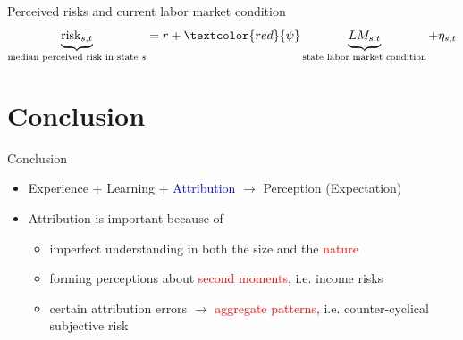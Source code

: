 \documentclass{beamer}
\begin{document}
	\begin{frame}{Perceived risks and current labor market condition}
	\begin{eqnarray*}
		\underbrace{\overline{\text{risk}_{s,t}} }_{\text{median perceived risk in state $s$}}= r + \textcolor{red}{\psi} \underbrace{LM_{s,t}}_{\text{state labor market condition}}  + \eta_{s,t}
	\end{eqnarray*}
		\begin{table}
			\centering
			\label{macro_corr_he}
		\end{table}
	\end{frame}
	


\section{Conclusion}

\begin{frame}{Conclusion}
	\begin{itemize}
		\item Experience + Learning + \textcolor{blue}{Attribution} $\rightarrow$ Perception (Expectation) 
		\item Attribution is important because of
		\begin{itemize}
			\item imperfect understanding in both the size and the \textcolor{red}{nature} 
			\item forming perceptions about \textcolor{red}{second moments}, i.e. income risks
			\item certain attribution errors $\rightarrow$ \textcolor{red}{aggregate patterns}, i.e. counter-cyclical subjective risk 
		\end{itemize} 
	\end{itemize}
\end{frame}



\end{document}
